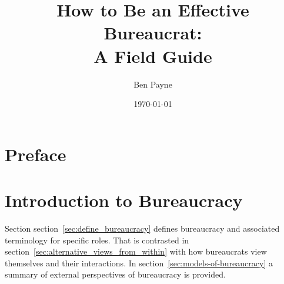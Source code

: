 \documentclass{book}
\title{How to Be an Effective Bureaucrat:\\
A Field Guide}
\author{Ben Payne}
\date{\today}
\begin{document}





\begin{titlepage}
\maketitle
\thispagestyle{empty}
\end{titlepage}
\clearpage

\frontmatter %

\clearpage

\hypertarget{contents}{}
\tableofcontents

\chapter{Preface}
\clearpage

\mainmatter %


\chapter{Introduction to Bureaucracy}

  Section section~\ref{sec:define_bureaucracy} defines bureaucracy and associated terminology for specific roles. That is contrasted in section~\ref{sec:alternative_views_from_within} with how bureaucrats view themselves and their interactions. In section~\ref{sec:models-of-bureaucracy} a summary of external perspectives of bureaucracy is provided. 
  
\end{document}
